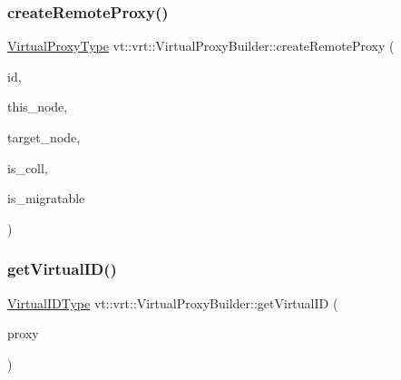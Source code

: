\subsubsection{\texorpdfstring{create\+Remote\+Proxy()}{createRemoteProxy()}}
{\footnotesize\ttfamily \hyperlink{namespacevt_a1b417dd5d684f045bb58a0ede70045ac}{Virtual\+Proxy\+Type} vt\+::vrt\+::\+Virtual\+Proxy\+Builder\+::create\+Remote\+Proxy (\begin{DoxyParamCaption}\item[{\hyperlink{namespacevt_1_1vrt_a8184ab8c530ce523edcdc4f4c38565be}{Virtual\+Remote\+I\+D\+Type} const \&}]{id,  }\item[{\hyperlink{namespacevt_a866da9d0efc19c0a1ce79e9e492f47e2}{Node\+Type} const \&}]{this\+\_\+node,  }\item[{\hyperlink{namespacevt_a866da9d0efc19c0a1ce79e9e492f47e2}{Node\+Type} const \&}]{target\+\_\+node,  }\item[{bool const \&}]{is\+\_\+coll,  }\item[{bool const \&}]{is\+\_\+migratable }\end{DoxyParamCaption})\hspace{0.3cm}{\ttfamily [static]}}

\mbox{\label{structvt_1_1vrt_1_1_virtual_proxy_builder_ae19d816cebcb1999c2f0f9c8126a7127}} 
\subsubsection{\texorpdfstring{get\+Virtual\+I\+D()}{getVirtualID()}}
{\footnotesize\ttfamily \hyperlink{namespacevt_1_1vrt_a84d0891f52f70728c3fc2172cffb464b}{Virtual\+I\+D\+Type} vt\+::vrt\+::\+Virtual\+Proxy\+Builder\+::get\+Virtual\+ID (\begin{DoxyParamCaption}\item[{\hyperlink{namespacevt_a1b417dd5d684f045bb58a0ede70045ac}{Virtual\+Proxy\+Type} const \&}]{proxy }\end{DoxyParamCaption})\hspace{0.3cm}{\ttfamily [static]}}

\mbox{\label{structvt_1_1vrt_1_1_virtual_proxy_builder_a7a1da6be27725072ef4805adb879521c}} 
